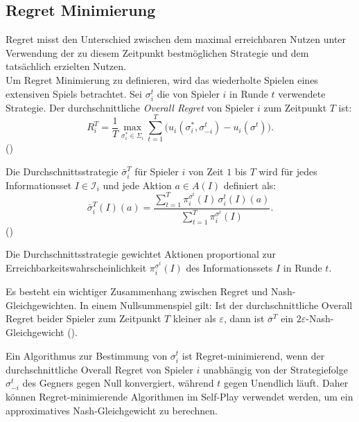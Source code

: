 \subsection{Regret Minimierung}
Regret misst den Unterschied zwischen dem maximal erreichbaren Nutzen unter Verwendung der zu diesem Zeitpunkt bestmöglichen Strategie und dem tatsächlich erzielten Nutzen.\\
Um Regret Minimierung zu definieren, wird das wiederholte Spielen eines extensiven Spiels betrachtet.
Sei $\sigma_i^t$ die von Spieler $i$ in Runde $t$ verwendete Strategie.
Der durchschnittliche \emph{Overall Regret} von Spieler $i$ zum Zeitpunkt $T$ ist:
\begin{equation}
R_i^T = \frac{1}{T}\max_{\sigma_i^\ast\in\Sigma_i}\sum_{t=1}^T \bigl(u_i(\sigma_i^\ast,\sigma_{-i}^t) - u_i(\sigma^t)\bigr).
\end{equation}
(\cite[Eq.~3]{zinkevich2007regret})

Die Durchschnittsstrategie $\bar\sigma_i^T$ für Spieler $i$ von Zeit $1$ bis $T$ wird für jedes Informationsset $I \in \mathcal{I}_i$ und jede Aktion $a \in A(I)$ definiert als:
\begin{equation}
\bar\sigma_i^T(I)(a) = \frac{\sum_{t=1}^T \pi_i^{\sigma^t}(I)\,\sigma_i^t(I)(a)}{\sum_{t=1}^T \pi_i^{\sigma^t}(I)}.
\end{equation}
(\cite[Eq.~4]{zinkevich2007regret})

Die Durchschnittsstrategie gewichtet Aktionen proportional zur Erreichbarkeitswahrscheinlichkeit $\pi_i^{\sigma^t}(I)$ des Informationssets $I$ in Runde $t$.

Es besteht ein wichtiger Zusammenhang zwischen Regret und Nash-Gleichgewichten.
In einem Nullsummenspiel gilt: Ist der durchschnittliche Overall Regret beider Spieler zum Zeitpunkt $T$ kleiner als $\varepsilon$, dann ist $\bar\sigma^T$ ein $2\varepsilon$-Nash-Gleichgewicht (\cite[Thm.~2]{zinkevich2007regret}).

Ein Algorithmus zur Bestimmung von $\sigma_i^t$ ist Regret-minimierend, wenn der durchschnittliche Overall Regret von Spieler $i$ unabhängig von der Strategiefolge $\sigma_{-i}^t$ des Gegners gegen Null konvergiert, während $t$ gegen Unendlich läuft.
Daher können Regret-minimierende Algorithmen im Self-Play verwendet werden, um ein approximatives Nash-Gleichgewicht zu berechnen.

